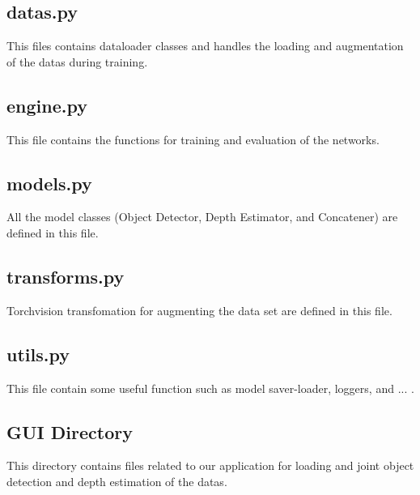 \documentclass[a4paper, openany]{book}
\begin{document}
\subsection{datas.py}
	\vspace{0.3cm}
This files contains dataloader classes and handles the loading and augmentation of the datas during training.

\subsection{engine.py}
	\vspace{0.3cm}
	
This file contains the functions for training and evaluation of the networks.

\subsection{models.py}
	\vspace{0.3cm}	
	
All the model classes (Object Detector, Depth Estimator, and Concatener) are defined in this file.
	
\subsection{transforms.py}
	\vspace{0.3cm}	
	
Torchvision transfomation for augmenting the data set are defined in this file.
	
\subsection{utils.py}
	\vspace{0.3cm}	
	
This file contain some useful function such as model saver-loader, loggers, and ... .

\subsection{GUI Directory}
	\vspace{0.3cm}	

This directory contains files related to our application for loading and joint object detection and depth estimation of the datas.






	\newpage
	
\end{document}
